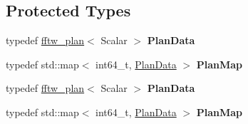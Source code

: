 \subsection*{Protected Types}
\begin{DoxyCompactItemize}
\item 
\mbox{\label{struct_eigen_1_1internal_1_1fftw__impl_a927f022380b01d7899812baa51511392}} 
typedef \hyperlink{struct_eigen_1_1internal_1_1fftw__plan}{fftw\+\_\+plan}$<$ Scalar $>$ {\bfseries Plan\+Data}
\item 
\mbox{\label{struct_eigen_1_1internal_1_1fftw__impl_a6897978e8a42fe20cddbbfa9257b9419}} 
typedef std\+::map$<$ int64\+\_\+t, \hyperlink{struct_eigen_1_1internal_1_1fftw__plan}{Plan\+Data} $>$ {\bfseries Plan\+Map}
\item 
\mbox{\label{struct_eigen_1_1internal_1_1fftw__impl_a927f022380b01d7899812baa51511392}} 
typedef \hyperlink{struct_eigen_1_1internal_1_1fftw__plan}{fftw\+\_\+plan}$<$ Scalar $>$ {\bfseries Plan\+Data}
\item 
\mbox{\label{struct_eigen_1_1internal_1_1fftw__impl_a6897978e8a42fe20cddbbfa9257b9419}} 
typedef std\+::map$<$ int64\+\_\+t, \hyperlink{struct_eigen_1_1internal_1_1fftw__plan}{Plan\+Data} $>$ {\bfseries Plan\+Map}
\end{DoxyCompactItemize}
